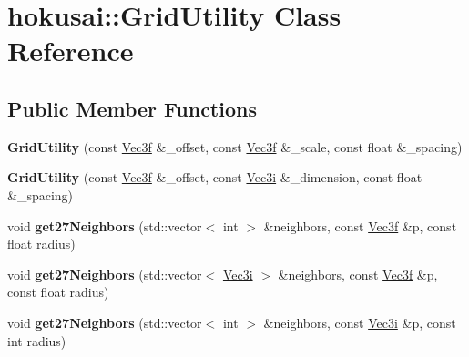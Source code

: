 \hypertarget{classhokusai_1_1GridUtility}{\section{hokusai\+:\+:Grid\+Utility Class Reference}
\label{classhokusai_1_1GridUtility}
}
\subsection*{Public Member Functions}
\begin{DoxyCompactItemize}
\item 
\hypertarget{classhokusai_1_1GridUtility_af72d1b226fb4a38406f21bf3954f06e3}{{\bfseries Grid\+Utility} (const \hyperlink{classhokusai_1_1Vec3}{Vec3f} \&\+\_\+offset, const \hyperlink{classhokusai_1_1Vec3}{Vec3f} \&\+\_\+scale, const float \&\+\_\+spacing)}\label{classhokusai_1_1GridUtility_af72d1b226fb4a38406f21bf3954f06e3}

\item 
\hypertarget{classhokusai_1_1GridUtility_acae46b055c1d4341fbeaacaa6fefe35a}{{\bfseries Grid\+Utility} (const \hyperlink{classhokusai_1_1Vec3}{Vec3f} \&\+\_\+offset, const \hyperlink{classhokusai_1_1Vec3}{Vec3i} \&\+\_\+dimension, const float \&\+\_\+spacing)}\label{classhokusai_1_1GridUtility_acae46b055c1d4341fbeaacaa6fefe35a}

\item 
\hypertarget{classhokusai_1_1GridUtility_ad6c79f73d3d99739f1337e4d60fc787a}{void {\bfseries get27\+Neighbors} (std\+::vector$<$ int $>$ \&neighbors, const \hyperlink{classhokusai_1_1Vec3}{Vec3f} \&p, const float radius)}\label{classhokusai_1_1GridUtility_ad6c79f73d3d99739f1337e4d60fc787a}

\item 
\hypertarget{classhokusai_1_1GridUtility_adf9819ed9dce84764b2c647a01fccc44}{void {\bfseries get27\+Neighbors} (std\+::vector$<$ \hyperlink{classhokusai_1_1Vec3}{Vec3i} $>$ \&neighbors, const \hyperlink{classhokusai_1_1Vec3}{Vec3f} \&p, const float radius)}\label{classhokusai_1_1GridUtility_adf9819ed9dce84764b2c647a01fccc44}

\item 
\hypertarget{classhokusai_1_1GridUtility_aa1587308cf7d6723630b6a509c23afbf}{void {\bfseries get27\+Neighbors} (std\+::vector$<$ int $>$ \&neighbors, const \hyperlink{classhokusai_1_1Vec3}{Vec3i} \&p, const int radius)}\label{classhokusai_1_1GridUtility_aa1587308cf7d6723630b6a509c23afbf}


\end{DoxyCompactItemize}
